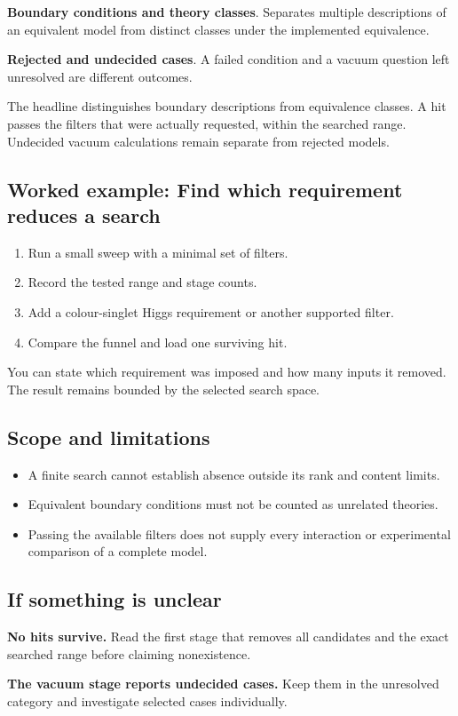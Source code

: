 \documentclass[11pt,a4paper]{article}
\begin{document}
\textbf{Boundary conditions and theory classes}. Separates multiple descriptions of an equivalent model from distinct classes under the implemented equivalence.

\textbf{Rejected and undecided cases}. A failed condition and a vacuum question left unresolved are different outcomes.

The headline distinguishes boundary descriptions from equivalence classes. A hit passes the filters that were actually requested, within the searched range. Undecided vacuum calculations remain separate from rejected models.
\subsection*{Worked example: Find which requirement reduces a search}
\begin{enumerate}
\item Run a small sweep with a minimal set of filters.
\item Record the tested range and stage counts.
\item Add a colour-singlet Higgs requirement or another supported filter.
\item Compare the funnel and load one surviving hit.
\end{enumerate}
You can state which requirement was imposed and how many inputs it removed. The result remains bounded by the selected search space.
\subsection*{Scope and limitations}
\begin{itemize}
\item A finite search cannot establish absence outside its rank and content limits.
\item Equivalent boundary conditions must not be counted as unrelated theories.
\item Passing the available filters does not supply every interaction or experimental comparison of a complete model.
\end{itemize}
\subsection*{If something is unclear}
\textbf{No hits survive.} Read the first stage that removes all candidates and the exact searched range before claiming nonexistence.

\textbf{The vacuum stage reports undecided cases.} Keep them in the unresolved category and investigate selected cases individually.
\end{document}
